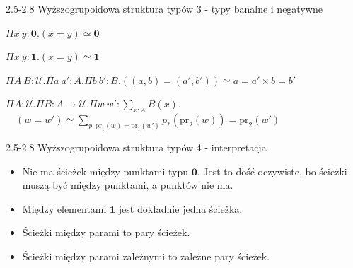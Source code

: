 \documentclass{beamer}
\newcommand{\U}{\mathcal{U}}
\newcommand{\prl}{\text{pr}_1}
\newcommand{\prr}{\text{pr}_2}
\begin{document}
\begin{frame}{2.5-2.8 Wyższogrupoidowa struktura typów 3 - typy banalne i negatywne}

\begin{theorem}
$\Pi x\ y : \mathbf{0}. (x = y) \simeq \mathbf{0}$
\end{theorem}

\begin{theorem}
$\Pi x\ y : \mathbf{1}. (x = y) \simeq \mathbf{1}$
\end{theorem}

\begin{theorem}
$\Pi A\ B : \U. \Pi a\ a' : A. \Pi b\ b': B. ((a, b) = (a', b')) \simeq a = a' \times b = b'$
\end{theorem}

\begin{theorem}
$\Pi A : \U. \Pi B : A \to \U. \Pi w\ w' : \sum_{x : A} B(x).$ \\
	$\displaystyle \quad (w = w') \simeq \sum_{p : \prl(w) = \prl(w')} p_*(\prr(w)) = \prr(w')$
\end{theorem}

\end{frame}
\begin{frame}{2.5-2.8 Wyższogrupoidowa struktura typów 4 - interpretacja}
\begin{itemize}
	\item Nie ma ścieżek między punktami typu $\mathbf{0}$. Jest to dość oczywiste, bo ścieżki muszą być między punktami, a punktów nie ma.
	\item Między elementami $\mathbf{1}$ jest dokładnie jedna ścieżka.
	\item Ścieżki między parami to pary ścieżek.
	\item Ścieżki między parami zależnymi to zależne pary ścieżek.
\end{itemize}
\end{frame}
\end{document}
